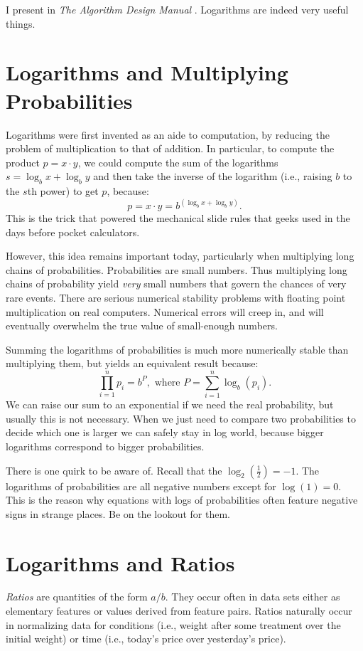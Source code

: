 \documentclass[10pt]{article}
\begin{document}
I present in \textit{The Algorithm Design Manual} \cite{Ski08}. Logarithms are indeed very useful things.

\section{Logarithms and Multiplying Probabilities}
Logarithms were first invented as an aide to computation, by reducing the problem of multiplication to that of addition. In particular, to compute the product $p = x \cdot y$, we could compute the sum of the logarithms $s = \log_b x + \log_b y$ and then take the inverse of the logarithm (i.e., raising $b$ to the $s$th power) to get $p$, because:
\[
p = x \cdot y = b^{(\log_b x + \log_b y)}.
\]
This is the trick that powered the mechanical slide rules that geeks used in the days before pocket calculators.

However, this idea remains important today, particularly when multiplying long chains of probabilities. Probabilities are small numbers. Thus multiplying long chains of probability yield \textit{very} small numbers that govern the chances of very rare events. There are serious numerical stability problems with floating point multiplication on real computers. Numerical errors will creep in, and will eventually overwhelm the true value of small-enough numbers.

Summing the logarithms of probabilities is much more numerically stable than multiplying them, but yields an equivalent result because:
\[
\prod_{i=1}^{n} p_i = b^P, \text{ where } P = \sum_{i=1}^{n} \log_b(p_i).
\]
We can raise our sum to an exponential if we need the real probability, but usually this is not necessary. When we just need to compare two probabilities to decide which one is larger we can safely stay in log world, because bigger logarithms correspond to bigger probabilities.

There is one quirk to be aware of. Recall that the $\log_2\left(\frac{1}{2}\right) = -1$. The logarithms of probabilities are all negative numbers except for $\log(1) = 0$. This is the reason why equations with logs of probabilities often feature negative signs in strange places. Be on the lookout for them.

\section{Logarithms and Ratios}
\textit{Ratios} are quantities of the form $a/b$. They occur often in data sets either as elementary features or values derived from feature pairs. Ratios naturally occur in normalizing data for conditions (i.e., weight after some treatment over the initial weight) or time (i.e., today’s price over yesterday’s price).
\end{document}
